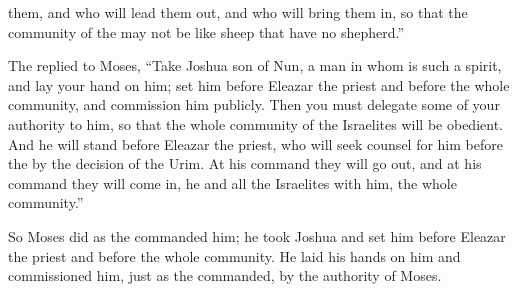 {them, and who
will lead them out,
and who
will bring
them in, so that
the community
of the {}
may not
be
like sheep
that
have no
shepherd.”
\par }{\PP {}The
{}
replied
to
Moses,
“Take
Joshua
son
of Nun,
a man
in whom
is such a spirit,
and lay
your hand
on him;
set
him before
Eleazar
the priest
and before
the whole
community,
and commission
him publicly.
Then
you must delegate
some of your authority to him, so that
the whole
community
of the Israelites
will be obedient.
And he will stand
before
Eleazar
the priest,
who will seek counsel
for him before
the {}
by the decision
of the Urim.
At his command they will go out,
and at his command
they will come
in, he
and all
the Israelites
with
him, the whole
community.”
\par }{\PP {}So Moses
did
as
the {}
commanded
him; he took
Joshua
and set
him before
Eleazar
the priest
and before
the whole
community.
He laid
his hands
on
him and commissioned
him, just
as the
{}
commanded,
by the authority
of Moses.


}
